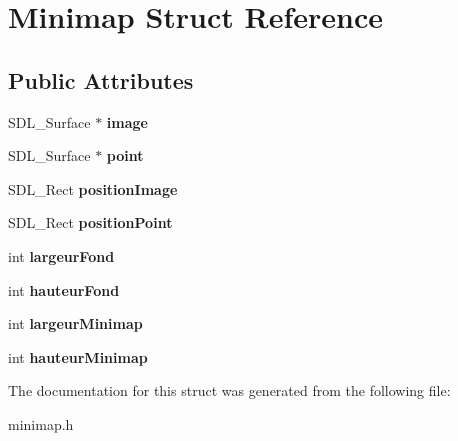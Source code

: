 \hypertarget{structMinimap}{}\section{Minimap Struct Reference}
\label{structMinimap}
\subsection*{Public Attributes}
\begin{DoxyCompactItemize}
\item 
\mbox{\label{structMinimap_ae1792d7a5459227ec30b7c1e84a586fc}} 
S\+D\+L\+\_\+\+Surface $\ast$ {\bfseries image}
\item 
\mbox{\label{structMinimap_a73ac826eda03036d5155107a3f09c859}} 
S\+D\+L\+\_\+\+Surface $\ast$ {\bfseries point}
\item 
\mbox{\label{structMinimap_aef71ccf7b909205b833a1f0a2e35ab2c}} 
S\+D\+L\+\_\+\+Rect {\bfseries position\+Image}
\item 
\mbox{\label{structMinimap_a5de6d582e4ddfb33bd6a67576f597893}} 
S\+D\+L\+\_\+\+Rect {\bfseries position\+Point}
\item 
\mbox{\label{structMinimap_a8dc5018c4e90d5dd04ce7de5fbcf30c3}} 
int {\bfseries largeur\+Fond}
\item 
\mbox{\label{structMinimap_a3d158a9ddb6bbf9764680b7a0a7258ff}} 
int {\bfseries hauteur\+Fond}
\item 
\mbox{\label{structMinimap_a6464a8fa9809cc4ab048058b43380bfc}} 
int {\bfseries largeur\+Minimap}
\item 
\mbox{\label{structMinimap_a449245f57db6d6164fb6bf552a010576}} 
int {\bfseries hauteur\+Minimap}
\end{DoxyCompactItemize}


The documentation for this struct was generated from the following file\+:\begin{DoxyCompactItemize}
\item 
minimap.\+h\end{DoxyCompactItemize}
